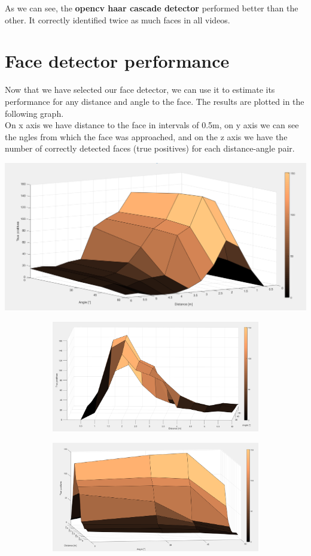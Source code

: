 \documentclass[12pt,a4paper]{article}
\begin{document}
	As we can see, the \textbf{opencv haar cascade detector} performed better than the other. It correctly identified twice as much faces in all videos. \\

	\section{Face detector performance}
	
	Now that we have selected our face detector, we can use it to estimate its performance for any distance and angle to the face. The results are plotted in the following graph. \\
	
	On x axis we have distance to the face in intervals of 0.5m, on y axis we can see the ngles from which the face was approached, and on the z axis we have the number of correctly detected faces (true positives) for each distance-angle pair. \\
	
	\begin{center}
		\includegraphics[width=.6\linewidth]{graf4}
	\end{center}
	
	\begin{figure}[H]
		\begin{subfigure}{.5\linewidth}
			\centering
			\includegraphics[width=.8\linewidth]{graf5}
		\end{subfigure}
		\begin{subfigure}{.5\linewidth}
			\centering
			\includegraphics[width=.8\linewidth]{graf6}
		\end{subfigure}
	\end{figure}
\end{document}

